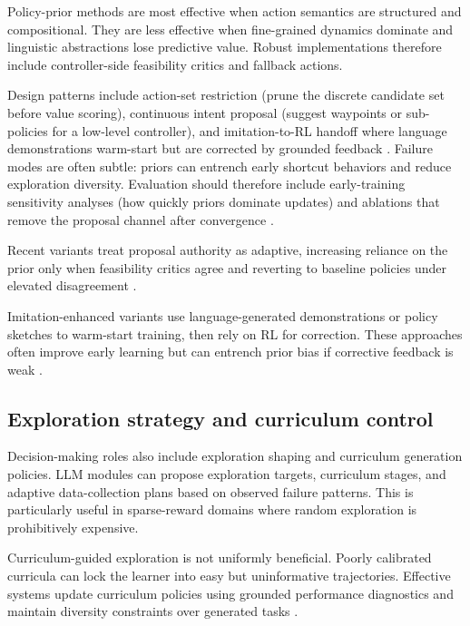 ﻿\documentclass[conference]{IEEEtran}
\begin{document}
Policy-prior methods are most effective when action semantics are structured and compositional. They are less effective when fine-grained dynamics dominate and linguistic abstractions lose predictive value. Robust implementations therefore include controller-side feasibility critics and fallback actions.

Design patterns include action-set restriction (prune the discrete candidate set before value scoring), continuous intent proposal (suggest waypoints or sub-policies for a low-level controller), and imitation-to-RL handoff where language demonstrations warm-start but are corrected by grounded feedback \cite{arxiv_p_2510_13229,arxiv_p_2510_14967,arxiv_p_2602_06554,arxiv_p_2509_26093}. Failure modes are often subtle: priors can entrench early shortcut behaviors and reduce exploration diversity. Evaluation should therefore include early-training sensitivity analyses (how quickly priors dominate updates) and ablations that remove the proposal channel after convergence \cite{arxiv_p_2511_13207,arxiv_p_2512_05686,arxiv_p_2601_11658}.

Recent variants treat proposal authority as adaptive, increasing reliance on the prior only when feasibility critics agree and reverting to baseline policies under elevated disagreement \cite{arxiv_p_2508_03680}.

Imitation-enhanced variants use language-generated demonstrations or policy sketches to warm-start training, then rely on RL for correction. These approaches often improve early learning but can entrench prior bias if corrective feedback is weak \cite{arxiv_p_2510_13229,arxiv_p_2510_14967,arxiv_p_2602_06554,arxiv_p_2509_26093}.

\subsection{Exploration strategy and curriculum control}
Decision-making roles also include exploration shaping and curriculum generation policies. LLM modules can propose exploration targets, curriculum stages, and adaptive data-collection plans based on observed failure patterns. This is particularly useful in sparse-reward domains where random exploration is prohibitively expensive.

Curriculum-guided exploration is not uniformly beneficial. Poorly calibrated curricula can lock the learner into easy but uninformative trajectories. Effective systems update curriculum policies using grounded performance diagnostics and maintain diversity constraints over generated tasks \cite{arxiv_p_2512_16848,arxiv_p_2602_07906,arxiv_p_2601_16486}.
\end{document}
